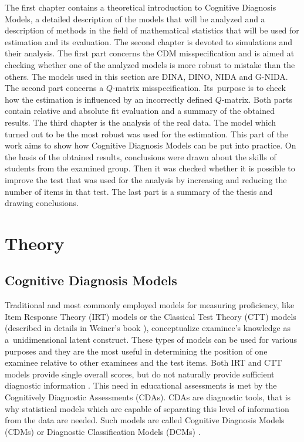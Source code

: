 \documentclass[english]{pwr_wmat_praca_dyplomowa}
\theoremstyle{plain}
\numberwithin{theorem}{chapter}
\theoremstyle{definition}
\numberwithin{theorem}{chapter}
\begin{document}
	The first chapter contains a theoretical introduction to Cognitive Diagnosis Models, a detailed description of the models that will be analyzed and a description of methods in the field of mathematical statistics that will be used for estimation and its evaluation. The second chapter is devoted to simulations and their analysis. The first part concerns the CDM misspecification and is aimed at checking whether one of the analyzed models is more robust to mistake than the others. The models used in this section are DINA, DINO, NIDA and G-NIDA. The second part concerns a $Q$-matrix misspecification. Its~purpose is to check how the estimation is influenced by an incorrectly defined $Q$-matrix. Both parts contain relative and absolute fit evaluation and a summary of the obtained results. The third chapter is the analysis of the real data. The model which turned out to be the most robust was used for the estimation. This part of the work aims to show how Cognitive Diagnosis Models can be put into practice. On the basis of the obtained results, conclusions were drawn about the skills of students from the examined group. Then it was checked whether it is possible to improve the test that was used for the analysis by increasing and reducing the number of items in that test. The last part is a summary of the thesis and drawing conclusions.
	
	\chapter{Theory}
	
	\section{Cognitive Diagnosis Models}
	
	Traditional and most commonly employed models for measuring proficiency, like Item Response Theory (IRT) models or the Classical Test Theory (CTT) models (described in details in Weiner's book \cite{irt_ctt}), conceptualize examinee's knowledge as a~unidimensional latent construct. These types of models can be used for various purposes and they are the most useful in determining the position of one examinee relative to other examinees and the test items. Both IRT and CTT models provide single overall scores, but do not naturally provide sufficient diagnostic information \cite{de_la_torre_2016}. This need in educational assessments is met by the Cognitively Diagnostic Assessments (CDAs). CDAs are diagnostic tools, that is why statistical models which are capable of separating this level of information from the data are needed. Such models are called Cognitive Diagnosis Models (CDMs) or Diagnostic Classification Models (DCMs) \cite{de_la_torre_2014,dino_model}. 
	
\end{document}
